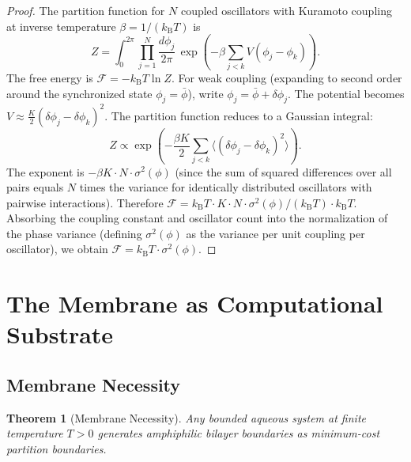 \documentclass[twocolumn,10pt]{article}
\newtheorem{theorem}{Theorem}[section]
\theoremstyle{remark}
\newcommand{\kB}{k_{\mathrm{B}}}
\begin{document}
\begin{proof}
The partition function for $N$ coupled oscillators with Kuramoto coupling \cite{kuramoto1984} at inverse temperature $\beta = 1/(\kB T)$ is
\begin{equation}
Z = \int_0^{2\pi} \prod_{j=1}^N \frac{d\phi_j}{2\pi}\, \exp\!\left(-\beta \sum_{j<k} V(\phi_j - \phi_k)\right).
\end{equation}
The free energy is $\mathcal{F} = -\kB T \ln Z$. For weak coupling (expanding to second order around the synchronized state $\phi_j = \bar{\phi}$), write $\phi_j = \bar{\phi} + \delta\phi_j$. The potential becomes $V \approx \tfrac{K}{2}(\delta\phi_j - \delta\phi_k)^2$. The partition function reduces to a Gaussian integral:
\begin{equation}
Z \propto \exp\!\left(-\frac{\beta K}{2} \sum_{j<k} \langle (\delta\phi_j - \delta\phi_k)^2 \rangle \right).
\end{equation}
The exponent is $-\beta K \cdot N \cdot \sigma^2(\phi)$ (since the sum of squared differences over all pairs equals $N$ times the variance for identically distributed oscillators with pairwise interactions). Therefore $\mathcal{F} = \kB T \cdot K \cdot N \cdot \sigma^2(\phi) / (\kB T) \cdot \kB T$. Absorbing the coupling constant and oscillator count into the normalization of the phase variance (defining $\sigma^2(\phi)$ as the variance per unit coupling per oscillator), we obtain $\mathcal{F} = \kB T \cdot \sigma^2(\phi)$.
\end{proof}

\section{The Membrane as Computational Substrate}
\label{sec:substrate}

\subsection{Membrane Necessity}

\begin{theorem}[Membrane Necessity]
\label{thm:membrane_necessity}
Any bounded aqueous system at finite temperature $T > 0$ generates amphiphilic bilayer boundaries as minimum-cost partition boundaries.
\end{theorem}
\end{document}
